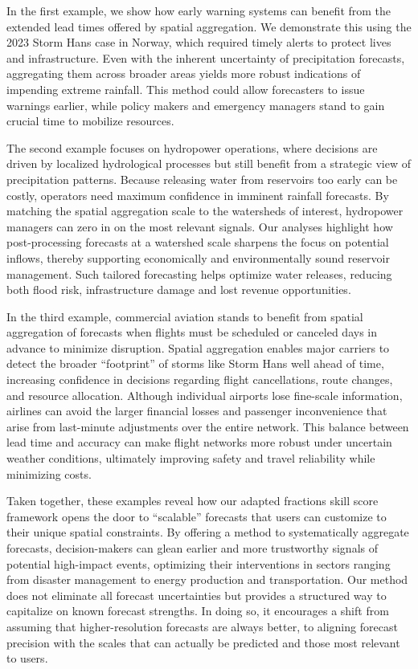 \documentclass[preprint,12pt,authoryear]{elsarticle}
\begin{document}
In the first example, we show how early warning systems can benefit from the extended lead times offered by spatial aggregation. We demonstrate this using the 2023 Storm Hans case in Norway, which required timely alerts to protect lives and infrastructure. Even with the inherent uncertainty of precipitation forecasts, aggregating them across broader areas yields more robust indications of impending extreme rainfall. This method could allow forecasters to issue warnings earlier, while policy makers and emergency managers stand to gain crucial time to mobilize resources.

The second example focuses on hydropower operations, where decisions are driven by localized hydrological processes but still benefit from a strategic view of precipitation patterns. Because releasing water from reservoirs too early can be costly, operators need maximum confidence in imminent rainfall forecasts. By matching the spatial aggregation scale to the watersheds of interest, hydropower managers can zero in on the most relevant signals. Our analyses highlight how post-processing forecasts at a watershed scale sharpens the focus on potential inflows, thereby supporting economically and environmentally sound reservoir management. Such tailored forecasting helps optimize water releases, reducing both flood risk, infrastructure damage and lost revenue opportunities.

In the third example, commercial aviation stands to benefit from spatial aggregation of forecasts when flights must be scheduled or canceled days in advance to minimize disruption. Spatial aggregation enables major carriers to detect the broader “footprint” of storms like Storm Hans well ahead of time, increasing confidence in decisions regarding flight cancellations, route changes, and resource allocation. Although individual airports lose fine-scale information, airlines can avoid the larger financial losses and passenger inconvenience that arise from last-minute adjustments over the entire network. This balance between lead time and accuracy can make flight networks more robust under uncertain weather conditions, ultimately improving safety and travel reliability while minimizing costs.

Taken together, these examples reveal how our adapted fractions skill score framework opens the door to “scalable” forecasts that users can customize to their unique spatial constraints. By offering a method to systematically aggregate forecasts, decision-makers can glean earlier and more trustworthy signals of potential high-impact events, optimizing their interventions in sectors ranging from disaster management to energy production and transportation. Our method does not eliminate all forecast uncertainties but provides a structured way to capitalize on known forecast strengths. In doing so, it encourages a shift from assuming that higher-resolution forecasts are always better, to aligning forecast precision with the scales that can actually be predicted and those most relevant to users. 
\end{document}
